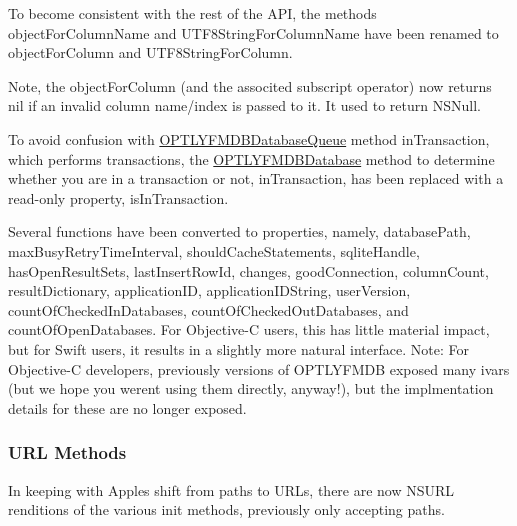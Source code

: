\begin{DoxyItemize}
\item To become consistent with the rest of the A\+PI, the methods {\ttfamily object\+For\+Column\+Name} and {\ttfamily U\+T\+F8\+String\+For\+Column\+Name} have been renamed to {\ttfamily object\+For\+Column} and {\ttfamily U\+T\+F8\+String\+For\+Column}.
\item Note, the {\ttfamily object\+For\+Column} (and the associted subscript operator) now returns {\ttfamily nil} if an invalid column name/index is passed to it. It used to return {\ttfamily N\+S\+Null}.
\item To avoid confusion with {\ttfamily \mbox{\hyperlink{interface_o_p_t_l_y_f_m_d_b_database_queue}{O\+P\+T\+L\+Y\+F\+M\+D\+B\+Database\+Queue}}} method {\ttfamily in\+Transaction}, which performs transactions, the {\ttfamily \mbox{\hyperlink{interface_o_p_t_l_y_f_m_d_b_database}{O\+P\+T\+L\+Y\+F\+M\+D\+B\+Database}}} method to determine whether you are in a transaction or not, {\ttfamily in\+Transaction}, has been replaced with a read-\/only property, {\ttfamily is\+In\+Transaction}.
\item Several functions have been converted to properties, namely, {\ttfamily database\+Path}, {\ttfamily max\+Busy\+Retry\+Time\+Interval}, {\ttfamily should\+Cache\+Statements}, {\ttfamily sqlite\+Handle}, {\ttfamily has\+Open\+Result\+Sets}, {\ttfamily last\+Insert\+Row\+Id}, {\ttfamily changes}, {\ttfamily good\+Connection}, {\ttfamily column\+Count}, {\ttfamily result\+Dictionary}, {\ttfamily application\+ID}, {\ttfamily application\+I\+D\+String}, {\ttfamily user\+Version}, {\ttfamily count\+Of\+Checked\+In\+Databases}, {\ttfamily count\+Of\+Checked\+Out\+Databases}, and {\ttfamily count\+Of\+Open\+Databases}. For Objective-\/C users, this has little material impact, but for Swift users, it results in a slightly more natural interface. Note\+: For Objective-\/C developers, previously versions of O\+P\+T\+L\+Y\+F\+M\+DB exposed many ivars (but we hope you weren\textquotesingle{}t using them directly, anyway!), but the implmentation details for these are no longer exposed.
\end{DoxyItemize}

\subsubsection*{U\+RL Methods}

In keeping with Apple\textquotesingle{}s shift from paths to U\+R\+Ls, there are now {\ttfamily N\+S\+U\+RL} renditions of the various {\ttfamily init} methods, previously only accepting paths.

